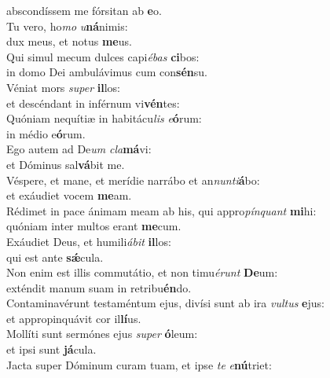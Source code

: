 \oddverse abscondíssem me fórsitan ab \textbf{e}o.\\
\evenverse Tu vero, ho\textit{mo} \textit{u}\textbf{ná}nimis:~\*\\
\evenverse dux meus, et notus \textbf{me}us.\\
\oddverse Qui simul mecum dulces capi\textit{é}\textit{bas} \textbf{ci}bos:~\*\\
\oddverse in domo Dei ambulávimus cum con\textbf{sén}su.\\
\evenverse Véniat mors \textit{su}\textit{per} \textbf{il}los:~\*\\
\evenverse et descéndant in inférnum vi\textbf{vén}tes:\\
\oddverse Quóniam nequítiæ in habitácu\textit{lis} \textit{e}\textbf{ó}rum:~\*\\
\oddverse in médio e\textbf{ó}rum.\\
\evenverse Ego autem ad De\textit{um} \textit{cla}\textbf{má}vi:~\*\\
\evenverse et Dóminus sal\textbf{vá}bit me.\\
\oddverse Véspere, et mane, et merídie narrábo et an\textit{nun}\textit{ti}\textbf{á}bo:~\*\\
\oddverse et exáudiet vocem \textbf{me}am.\\
\evenverse Rédimet in pace ánimam meam ab his, qui appro\textit{pín}\textit{quant} \textbf{mi}hi:~\*\\
\evenverse quóniam inter multos erant \textbf{me}cum.\\
\oddverse Exáudiet Deus, et humili\textit{á}\textit{bit} \textbf{il}los:~\*\\
\oddverse qui est ante \textbf{sǽ}cula.\\
\evenverse Non enim est illis commutátio, et non timu\textit{é}\textit{runt} \textbf{De}um:~\*\\
\evenverse exténdit manum suam in retribu\textbf{én}do.\\
\oddverse Contaminavérunt testaméntum ejus, divísi sunt ab ira \textit{vul}\textit{tus} \textbf{e}jus:~\*\\
\oddverse et appropinquávit cor il\textbf{lí}us.\\
\evenverse Mollíti sunt sermónes ejus \textit{su}\textit{per} \textbf{ó}leum:~\*\\
\evenverse et ipsi sunt \textbf{já}cula.\\
\oddverse Jacta super Dóminum curam tuam, et ipse \textit{te} \textit{e}\textbf{nú}triet:~\*\\
